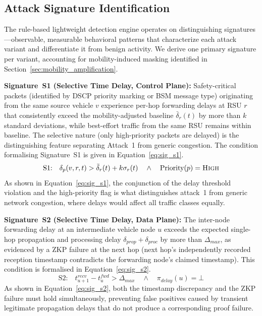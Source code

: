 \documentclass[12pt, a4paper]{report}
\begin{document}
\subsection{Attack Signature Identification}   %
\label{sec:attack_signatures}

The rule-based lightweight detection engine operates on distinguishing
signatures---observable, measurable behavioral patterns that characterize
each attack variant and differentiate it from benign activity. We derive
one primary signature per variant, accounting for mobility-induced
masking identified in Section~\ref{sec:mobility_amplification}.

\textbf{Signature~S1 (Selective Time Delay, Control Plane):}
Safety-critical packets (identified by DSCP priority marking or BSM
message type) originating from the same source vehicle $v$ experience
per-hop forwarding delays at RSU $r$ that consistently exceed the
mobility-adjusted baseline $\bar{\delta}_r(t)$ by more than $k$
standard deviations, while best-effort traffic from the same RSU
remains within baseline. The selective nature (only high-priority
packets are delayed) is the distinguishing feature separating Attack~1
from generic congestion.
The condition formalising Signature~S1 is given in
Equation~\eqref{eq:sig_s1}.
\begin{equation}
\text{S1:}\quad \delta_p(v,r,t) > \bar{\delta}_r(t) + k\sigma_r(t)
\quad \land \quad \text{Priority}(p) = \textsc{High}
\label{eq:sig_s1}
\end{equation}
As shown in Equation~\eqref{eq:sig_s1}, the conjunction of the
delay threshold violation and the high-priority flag is what
distinguishes attack~1 from generic network congestion, where delays
would affect all traffic classes equally.

\textbf{Signature~S2 (Selective Time Delay, Data Plane):}
The inter-node forwarding delay at an intermediate vehicle node $u$
exceeds the expected single-hop propagation and processing delay
$\delta_{prop} + \delta_{proc}$ by more than $\Delta_{max}$, as
evidenced by a ZKP failure at the next hop (next hop's independently
recorded reception timestamp contradicts the forwarding node's claimed
timestamp).
This condition is formalised in Equation~\eqref{eq:sig_s2}.
\begin{equation}
\text{S2:}\quad t^{recv}_{u+1} - t^{fwd}_{u} > \Delta_{max}
\quad \land \quad \pi_{delay}(u) = \bot
\label{eq:sig_s2}
\end{equation}
As shown in Equation~\eqref{eq:sig_s2}, both the timestamp
discrepancy and the ZKP failure must hold simultaneously, preventing
false positives caused by transient legitimate propagation delays that
do not produce a corresponding proof failure.
\end{document}
